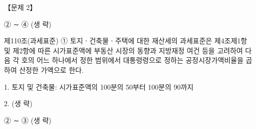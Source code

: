 \begin{longquestion}{【문제 2】}
\begin{framedtext}
② ∼ ④ (생 략) \par
제110조(과세표준) ① 토지ㆍ건축물ㆍ주택에 대한 재산세의 과세표준은 제4조제1항 및 제2항에 따른 시가표준액에 부동산 시장의 동향과 지방재정 여건 등을 고려하여 다음 각 호의 어느 하나에서 정한 범위에서 대통령령으로 정하는 공정시장가액비율을 곱하여 산정한 가액으로 한다. \par
1. 토지 및 건축물: 시가표준액의 100분의 50부터 100분의 90까지 \par
2. (생 략) \par
② ∼ ③ (생 략) \par
\end{framedtext}
\end{longquestion}
